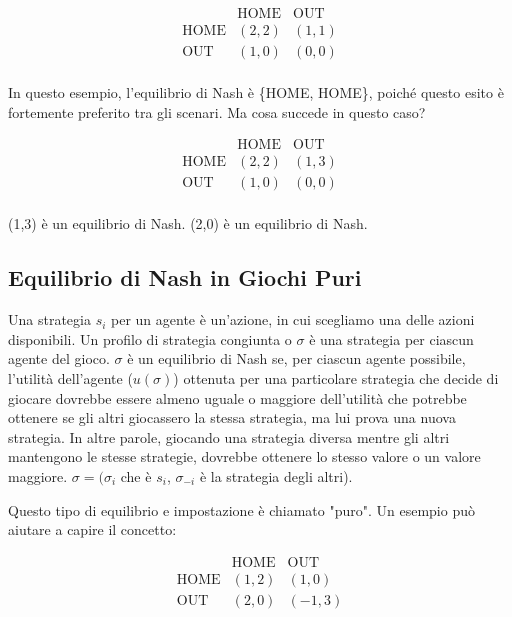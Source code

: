 \[
    \begin{array}{ccc}
                    & \text{HOME} & \text{OUT} \\
        \text{HOME} & (2, 2)      & (1, 1)     \\
        \text{OUT}  & (1, 0)      & (0, 0)     \\
    \end{array}
\]

In questo esempio, l'equilibrio di Nash è \{HOME, HOME\}, poiché questo esito è
fortemente preferito tra gli scenari. Ma cosa succede in questo caso?

\[
    \begin{array}{ccc}
                    & \text{HOME} & \text{OUT} \\
        \text{HOME} & (2, 2)      & (1, 3)     \\
        \text{OUT}  & (1, 0)      & (0, 0)     \\
    \end{array}
\]

(1,3) è un equilibrio di Nash. (2,0) è un equilibrio di Nash.

\subsection{Equilibrio di Nash in Giochi Puri}

Una strategia $s_i$ per un agente è un'azione, in cui scegliamo una delle
azioni disponibili. Un profilo di strategia congiunta o $\sigma$ è una
strategia per ciascun agente del gioco. $\sigma$ è un equilibrio di Nash se,
per ciascun agente possibile, l'utilità dell'agente ($u(\sigma)$) ottenuta per
una particolare strategia che decide di giocare dovrebbe essere almeno uguale o
maggiore dell'utilità che potrebbe ottenere se gli altri giocassero la stessa
strategia, ma lui prova una nuova strategia. In altre parole, giocando una
strategia diversa mentre gli altri mantengono le stesse strategie, dovrebbe
ottenere lo stesso valore o un valore maggiore. $\sigma = (\sigma_i$ che è
$s_i$, $\sigma_{-i}$ è la strategia degli altri).

Questo tipo di equilibrio e impostazione è chiamato "puro". Un esempio può
aiutare a capire il concetto:

\[
    \begin{array}{ccc}
                    & \text{HOME} & \text{OUT} \\
        \text{HOME} & (1, 2)      & (1, 0)     \\
        \text{OUT}  & (2, 0)      & (-1, 3)    \\
    \end{array}
\]

